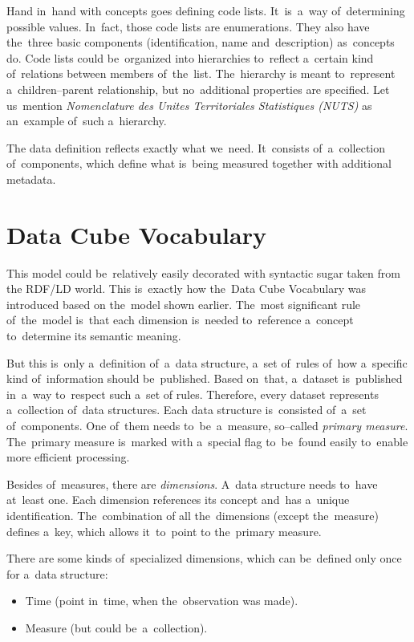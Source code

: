 \label{SDMX-code-lists}
Hand in~hand with concepts goes defining code lists. It~is~a~way of~determining possible
values. In~fact, those code lists are enumerations. They also have the~three basic components
(identification, name and~description) as~concepts do. Code lists could be~organized into
hierarchies to~reflect a~certain kind of~relations between members of~the~list. The~hierarchy
is meant to~represent a~children--parent relationship, but no~additional properties are specified.
Let us~mention \emph{Nomenclature des Unites Territoriales Statistiques (NUTS)} 
as an~example of~such a~hierarchy.

The data definition reflects exactly what we~need. It~consists of~a~collection of~components, which define what is~being measured together with additional metadata.

\section{Data Cube Vocabulary}
\label{datacube-vocabulary}

This model could be~relatively easily decorated with syntactic sugar taken from the
RDF/LD world. This is~exactly how the~Data Cube Vocabulary was introduced based
on the~model shown earlier. The~most significant rule of~the~model is~that each
dimension is~needed to~reference a~concept to~determine its semantic meaning.

But this is~only a~definition of~a~data structure, a~set of~rules of~how a~specific kind of~information
should be~published. Based on~that, a~dataset is~published in~a~way to~respect such a~set
of rules. Therefore, every dataset represents a~collection of~data structures. Each data
structure is~consisted of~a~set of~components. One of~them needs to~be~a~measure,
so--called \emph{primary measure}. The~primary measure is~marked with a~special flag to~be~found
easily to~enable more efficient processing.

Besides of~measures, there are \emph{dimensions}. A~data structure needs to~have at~least one.
Each dimension references its concept and~has a~unique identification. The~combination of
all the~dimensions (except the~measure) defines a~key, which allows it~to~point
to the~primary measure.

There are some kinds of~specialized dimensions, which can be~defined only once
for a~data structure:

\begin{itemize}
\item Time (point in~time, when the~observation was made).
\item Measure (but could be~a~collection).
\end{itemize}

